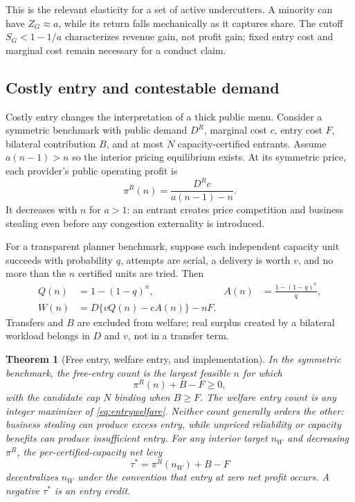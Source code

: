 \documentclass[sigconf,nonacm]{acmart}
\newtheorem{theorem}{Theorem}
\newcommand{\1}{\mathbf 1}
\begin{document}
This is the relevant elasticity for a set of active undercutters.  A minority
can have $Z_G\approx a$, while its return falls mechanically as it captures
share.  The cutoff $S_G<1-1/a$ characterizes revenue gain, not profit gain;
fixed entry cost and marginal cost remain necessary for a conduct claim.

\subsection{Costly entry and contestable demand}
\label{sec:entry}

Costly entry changes the interpretation of a thick public menu.  Consider a
symmetric benchmark with public demand $D^R$, marginal cost $c$, entry cost
$F$, bilateral contribution $B$, and at most $N$ capacity-certified entrants.
Assume $a(n-1)>n$ so the interior pricing equilibrium exists.  At its symmetric
price, each provider's public operating profit is
\begin{equation}
 \pi^R(n)=\frac{D^R c}{a(n-1)-n}.
 \label{eq:publicprofit}
\end{equation}
It decreases with $n$ for $a>1$: an entrant creates price competition and
business stealing even before any congestion externality is introduced.

For a transparent planner benchmark, suppose each independent capacity unit
succeeds with probability $q$, attempts are serial, a delivery is worth $v$,
and no more than the $n$ certified units are tried.  Then
\begin{align}
 Q(n)&=1-(1-q)^n, & A(n)&=\frac{1-(1-q)^n}{q},\\
 W(n)&=D\{vQ(n)-cA(n)\}-nF.
 \label{eq:entrywelfare}
\end{align}
Transfers and $B$ are excluded from welfare; real surplus created by a
bilateral workload belongs in $D$ and $v$, not in a transfer term.

\begin{theorem}[Free entry, welfare entry, and implementation]
\label{thm:entry}
In the symmetric benchmark, the free-entry count is the largest feasible $n$
for which
\begin{equation}
 \pi^R(n)+B-F\ge0,
 \label{eq:freeentry}
\end{equation}
with the candidate cap $N$ binding when $B\ge F$.  The welfare entry count is
any integer maximizer of \eqref{eq:entrywelfare}.  Neither count generally
orders the other: business stealing can produce excess entry, while unpriced
reliability or capacity benefits can produce insufficient entry.  For any
interior target $n_W$ and decreasing $\pi^R$, the per-certified-capacity net
levy
\begin{equation}
 \tau^*=\pi^R(n_W)+B-F
 \label{eq:entrylevy}
\end{equation}
decentralizes $n_W$ under the convention that entry at zero net profit occurs.
A negative $\tau^*$ is an entry credit.
\end{theorem}
\end{document}
